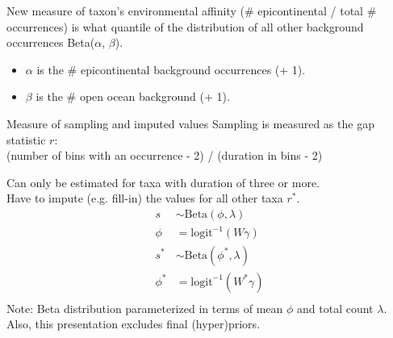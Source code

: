 \documentclass{beamer}
\begin{document}
\begin{frame}
  \begin{block}{New measure of taxon's environmental affinity}
    (\# epicontinental / total \# occurrences) is what quantile of the distribution of all other background occurrences Beta(\(\alpha\), \(\beta\)).
    \begin{itemize}
      \item \(\alpha\) is the \# epicontinental background occurrences (+ 1).
      \item \(\beta\) is the \# open ocean background (+ 1).
    \end{itemize}
  \end{block}
\end{frame}


\begin{frame}
  \begin{block}{Measure of sampling and imputed values}
    Sampling is measured as the gap statistic \(r\): \\(number of bins with an occurrence - 2) / (duration in bins - 2)

    Can only be estimated for taxa with duration of three or more. \\Have to impute (e.g. fill-in) the values for all other taxa \(r^{\ast}\).
    \begin{align*}
      s &\sim \text{Beta}(\phi, \lambda) \\
      \phi &= \text{logit}^{-1}(W\gamma) \\
      s^{\ast} &\sim \text{Beta}(\phi^{\ast}, \lambda) \\
      \phi^{\ast} &= \text{logit}^{-1}(W^{\ast}\gamma) \\
    \end{align*}
    \scriptsize{Note: Beta distribution parameterized in terms of mean \(\phi\) and total count \(\lambda\). \\Also, this presentation excludes final (hyper)priors.}
  \end{block}
\end{frame}
\end{document}

